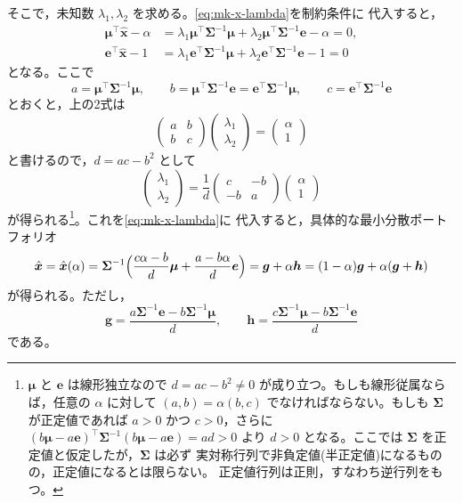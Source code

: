 そこで，未知数 $\lambda_1,\lambda_2$ を求める。\eqref{eq:mk-x-lambda}を制約条件に
代入すると，
\begin{align}
\bm{\mu}^\top\hat{\bm{x}} - \alpha
&= \lambda_1\bm{\mu}^\top\bm{\Sigma}^{-1}\bm{\mu}
+ \lambda_2\bm{\mu}^\top\bm{\Sigma}^{-1}\bm{e} - \alpha = 0,\\
\bm{e}^\top\hat{\bm{x}} - 1
&= \lambda_1\bm{e}^\top\bm{\Sigma}^{-1}\bm{\mu}
+ \lambda_2\bm{e}^\top\bm{\Sigma}^{-1}\bm{e} - 1 = 0
\end{align}
となる。ここで
\begin{equation}
a = \bm{\mu}^\top\bm{\Sigma}^{-1}\bm{\mu},\qquad
b = \bm{\mu}^\top\bm{\Sigma}^{-1}\bm{e} = \bm{e}^\top\bm{\Sigma}^{-1}\bm{\mu},\qquad
c = \bm{e}^\top\bm{\Sigma}^{-1}\bm{e}
\label{eq:mk-abc}
\end{equation}
とおくと，上の2式は
\begin{equation}
\begin{pmatrix} a & b\\ b & c\end{pmatrix}
\begin{pmatrix}\lambda_1\\ \lambda_2\end{pmatrix}
= \begin{pmatrix}\alpha\\ 1\end{pmatrix}
\end{equation}
と書けるので，$d = ac - b^2$ として
\begin{equation}
\begin{pmatrix}\lambda_1\\ \lambda_2\end{pmatrix}
= \frac{1}{d}\begin{pmatrix} c & -b\\ -b & a\end{pmatrix}
\begin{pmatrix}\alpha\\ 1\end{pmatrix}
\end{equation}
が得られる\footnote{$\bm{\mu}$ と $\bm{e}$ は線形独立なので
$d = ac - b^2 \neq 0$ が成り立つ。もしも線形従属ならば，任意の $\alpha$ に対して
$(a,b) = \alpha(b,c)$ でなければならない。もしも $\bm{\Sigma}$ が正定値であれば
$a>0$ かつ $c>0$，さらに
$(b\bm{\mu}-a\bm{e})^\top\bm{\Sigma}^{-1}(b\bm{\mu}-a\bm{e}) = ad > 0$ より
$d>0$ となる。ここでは $\bm{\Sigma}$ を正定値と仮定したが，$\bm{\Sigma}$ は必ず
実対称行列で非負定値(半正定値)になるものの，正定値になるとは限らない。
正定値行列は正則，すなわち逆行列をもつ。}。これを\eqref{eq:mk-x-lambda}に
代入すると，具体的な最小分散ポートフォリオ
\begin{equation}
\hat{\bm{x}} = \hat{\bm{x}}(\alpha)
= \bm{\Sigma}^{-1}\Bigl(\frac{c\alpha - b}{d}\bm{\mu}
+ \frac{a - b\alpha}{d}\bm{e}\Bigr)
= \bm{g} + \alpha\bm{h}
= (1-\alpha)\bm{g} + \alpha(\bm{g}+\bm{h})
\label{eq:mk-solution}
\end{equation}
が得られる。ただし，
\begin{equation}
\bm{g} = \frac{a\bm{\Sigma}^{-1}\bm{e} - b\bm{\Sigma}^{-1}\bm{\mu}}{d},
\qquad
\bm{h} = \frac{c\bm{\Sigma}^{-1}\bm{\mu} - b\bm{\Sigma}^{-1}\bm{e}}{d}
\label{eq:mk-gh}
\end{equation}
である。

